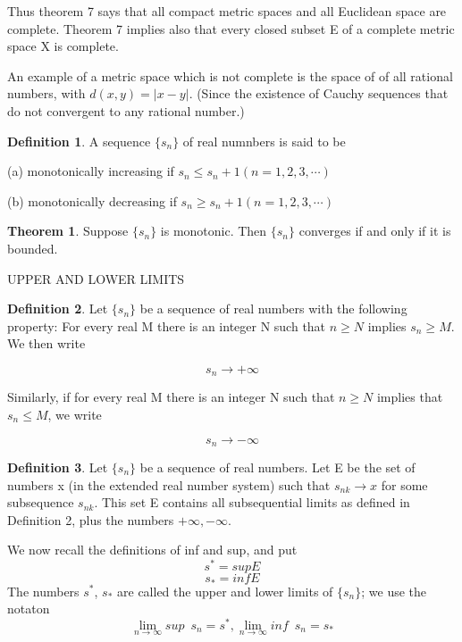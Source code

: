 \documentclass{article}
\theoremstyle{definition}
\newtheorem{defi}{Definition}
\newtheorem{theo}{Theorem}
\theoremstyle{remark}
\begin{document}
Thus theorem 7 says that all compact metric spaces and all Euclidean space are complete. Theorem 7 implies also that every closed subset E of a complete metric space X is complete.

An example of a metric space which is not complete is the space of of all rational numbers, with $d(x,y)=|x-y|$. (Since the existence of Cauchy sequences that do not convergent to any rational number.)

\begin{defi}
A sequence $\{s_n\}$ of real numnbers is said to be 

(a) monotonically increasing if $s_n\le s_n+1(n=1,2,3,\cdots)$

(b) monotonically decreasing if $s_n\ge s_n+1(n=1,2,3,\cdots)$
\end{defi}

\begin{theo}
Suppose $\{s_n\}$ is monotonic. Then $\{s_n\}$ converges if and only if it is bounded.
\end{theo}

\newpage

UPPER AND LOWER LIMITS

\begin{defi}
Let $\{s_n\}$ be a sequence of real numbers with the following property: For every real M there is an integer N such that $n\ge N$ implies $s_n\ge M$. We then write

\[
s_n\rightarrow+\infty
\]	

Similarly, if for every real M there is an integer N such that $n\ge N$ implies that $s_n\le M$, we write

\[
s_n\rightarrow-\infty
\]
\end{defi}

\begin{defi}
Let $\{s_n\}$ be a sequence of real numbers. Let E be the set of numbers x (in the extended real number system) such that $s_{nk}\rightarrow x$ for some subsequence $s_{nk}$. This set E contains all subsequential limits as defined in Definition 2, plus the numbers $+\infty,-\infty$.

We now recall the definitions of inf and sup, and put
\[
s^*=sup E
\]
\[
s_*=inf E
\]
The numbers $s^*$, $s_*$ are called the upper and lower limits of $\{s_n\}$; we use the notaton
\[
\lim_{n\rightarrow\infty} sup\enspace s_n=s^*,\lim_{n\rightarrow\infty}inf\enspace s_n=s_*
\]

\end{defi}
\end{document}
